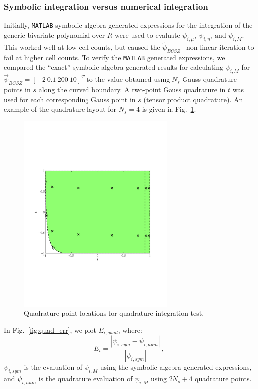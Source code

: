 \documentclass{mc2015}
\newcommand{\fig}[1]{Fig.~\ref{#1}}                      %
\newcommand{\benum}{\begin{equation}} 			%
\newcommand{\eenum}{\end{equation}}
\newcommand{\abs}[1]{\ensuremath{\left\lvert #1 \right\rvert}}
\newcommand{\BCSZ}{\ensuremath{\widetilde{\psi}_{BCSZ}}}
\newcommand{\pec}{\, ,}
\begin{document}
\subsubsection{Symbolic integration versus numerical integration}

Initially, \verb+MATLAB+ symbolic algebra generated expressions for the integration of the generic bivariate polynomial over $R$ were used to evaluate $\psi_{i,\mu},~\psi_{i,\eta},~\text{and }\psi_{i,M}$.  This worked well at low cell counts, but caused the \BCSZ~ non-linear iteration to fail at higher cell counts.
To verify the \verb+MATLAB+ generated expressions, we compared the ``exact'' symbolic algebra generated results for calculating $\psi_{i,M}$ for $\vec{\psi}_{BCSZ} = [-2 ~0.1~200~10]^T$ to the value obtained using $N_s$ Gauss quadrature points in $s$ along the curved boundary.  
A two-point Gauss quadrature in $t$ was used for each corresponding Gauss point in $s$ (tensor product quadrature).  An example of the quadrature layout for $N_s=4$ is given in \fig{fig:quad}.
\begin{figure}[h]
\centering
\includegraphics[width=3in,trim=0.5in  2.5in  1.in 2.5in,clip=true]{quad_layout.pdf}
\caption{Quadrature point locations for quadrature integration test.}
\label{fig:quad}
\end{figure}
In \fig{fig:quad_err}, we plot $E_{i,quad}$, where:
\benum
E_{i} = \frac{\abs{ \psi_{i,sym} - \psi_{i,num} }}{\abs{\psi_{i,sym} }} \pec
\eenum
$\psi_{i,sym}$ is the evaluation of $\psi_{i,M}$ using the symbolic algebra generated expressions, and $\psi_{i,num}$ is the quadrature evaluation of $\psi_{i,M}$ using $2N_s + 4$ quadrature points.
\end{document}
